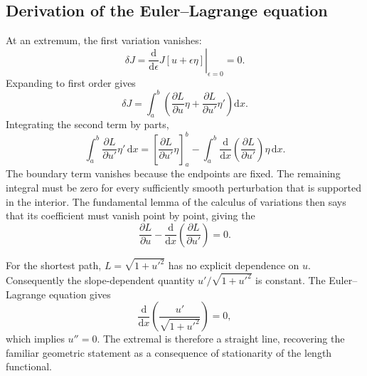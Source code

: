 \subsection{Derivation of the Euler--Lagrange equation}
At an extremum, the first variation vanishes:
\begin{equation}
\delta J=\left.\frac{\mathrm{d}}{\mathrm{d}\epsilon}J[u+\epsilon\eta]\right|_{\epsilon=0}=0.
\end{equation}
Expanding to first order gives
\begin{equation}
\delta J=\int_a^b\left(
\frac{\partial L}{\partial u}\eta
+\frac{\partial L}{\partial u'}\eta'
\right)\mathrm{d}x.
\end{equation}
Integrating the second term by parts,
\begin{equation}
\int_a^b\frac{\partial L}{\partial u'}\eta'\,\mathrm{d}x
=\left[\frac{\partial L}{\partial u'}\eta\right]_a^b
-\int_a^b\frac{\mathrm{d}}{\mathrm{d}x}\left(\frac{\partial L}{\partial u'}\right)\eta\,\mathrm{d}x.
\end{equation}
The boundary term vanishes because the endpoints are fixed. The remaining integral must be zero for every sufficiently smooth perturbation that is supported in the interior. The fundamental lemma of the calculus of variations then says that its coefficient must vanish point by point, giving the 
\begin{equation}
\boxed{\frac{\partial L}{\partial u}
-\frac{\mathrm{d}}{\mathrm{d}x}\left(\frac{\partial L}{\partial u'}\right)=0.}
\end{equation}

For the shortest path, $L=\sqrt{1+u'^2}$ has no explicit dependence on $u$. Consequently the slope-dependent quantity $u'/\sqrt{1+u'^2}$ is constant. The Euler--Lagrange equation gives
\begin{equation}
\frac{\mathrm{d}}{\mathrm{d}x}\left(\frac{u'}{\sqrt{1+u'^2}}\right)=0,
\end{equation}
which implies $u''=0$. The extremal is therefore a straight line, recovering the familiar geometric statement as a consequence of stationarity of the length functional.

